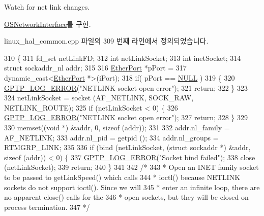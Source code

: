 Watch for net link changes. 



\hyperlink{class_o_s_network_interface_afc43662e3774645bd8443dc68e5e6ea2}{O\+S\+Network\+Interface}를 구현.



linux\+\_\+hal\+\_\+common.\+cpp 파일의 309 번째 라인에서 정의되었습니다.


\begin{DoxyCode}
310 \{
311     fd\_set netLinkFD;
312     \textcolor{keywordtype}{int} netLinkSocket;
313     \textcolor{keywordtype}{int} inetSocket;
314     \textcolor{keyword}{struct }sockaddr\_nl addr;
315 
316     \hyperlink{class_ether_port}{EtherPort} *pPort =
317         \textcolor{keyword}{dynamic\_cast<}\hyperlink{class_ether_port}{EtherPort} *\textcolor{keyword}{>}(iPort);
318     \textcolor{keywordflow}{if}( pPort == \hyperlink{openavb__types__base__pub_8h_a070d2ce7b6bb7e5c05602aa8c308d0c4}{NULL} )
319     \{
320         \hyperlink{gptp__log_8hpp_afefbb1009717c128012bfeed94842987}{GPTP\_LOG\_ERROR}(\textcolor{stringliteral}{"NETLINK socket open error"});
321         \textcolor{keywordflow}{return};
322     \}
323 
324     netLinkSocket = socket (AF\_NETLINK, SOCK\_RAW, NETLINK\_ROUTE);
325     \textcolor{keywordflow}{if} (netLinkSocket < 0) \{
326         \hyperlink{gptp__log_8hpp_afefbb1009717c128012bfeed94842987}{GPTP\_LOG\_ERROR}(\textcolor{stringliteral}{"NETLINK socket open error"});
327         \textcolor{keywordflow}{return};
328     \}
329 
330     memset((\textcolor{keywordtype}{void} *) &addr, 0, \textcolor{keyword}{sizeof} (addr));
331 
332     addr.nl\_family = AF\_NETLINK;
333     addr.nl\_pid = getpid ();
334     addr.nl\_groups = RTMGRP\_LINK;
335 
336     \textcolor{keywordflow}{if} (bind (netLinkSocket, (\textcolor{keyword}{struct} sockaddr *) &addr, \textcolor{keyword}{sizeof} (addr)) < 0) \{
337         \hyperlink{gptp__log_8hpp_afefbb1009717c128012bfeed94842987}{GPTP\_LOG\_ERROR}(\textcolor{stringliteral}{"Socket bind failed"});
338         close (netLinkSocket);
339         \textcolor{keywordflow}{return};
340     \}
341 
342     \textcolor{comment}{/*}
343 \textcolor{comment}{     * Open an INET family socket to be passed to getLinkSpeed() which calls}
344 \textcolor{comment}{     * ioctl() because NETLINK sockets do not support ioctl(). Since we will}
345 \textcolor{comment}{     * enter an infinite loop, there are no apparent close() calls for the}
346 \textcolor{comment}{     * open sockets, but they will be closed on process termination.}
347 \textcolor{comment}{     */}

\end{DoxyCode}
